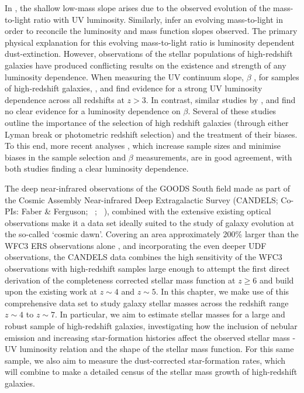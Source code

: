 In \citet{Gonzalez:2011dn}, the shallow low-mass slope arises due to the observed evolution of the mass-to-light ratio with UV luminosity. Similarly, \citet{2012ApJ...752...66L} infer an evolving mass-to-light in order to reconcile the luminosity and mass function slopes observed. The primary physical explanation for this evolving mass-to-light ratio is luminosity dependent dust-extinction. However, observations of the stellar populations of high-redshift galaxies have produced conflicting results on the existence and strength of any luminosity dependence. When measuring the UV continuum slope, $\beta$ \citep{1994ApJ...429..582C}, for samples of high-redshift galaxies, \citet{Wilkins:2011fs}, \citet{2012ApJ...754...83B} and \citet{Bouwens:2013vf} find evidence for a strong UV luminosity dependence across all redshifts at $z > 3$. In contrast, similar studies by \citet{Dunlop:2011jl}, \citet{2012ApJ...756..164F} and \citet{2013MNRAS.429.2456R} find no clear evidence for a luminosity dependence on $\beta$. Several of these studies outline the importance of the selection of high redshift galaxies (through either Lyman break or photometric redshift selection) and the treatment of their biases. To this end, more recent analyses \citep{Bouwens:2013vf,Rogers:2014bn}, which increase sample sizes and minimise biases in the sample selection and $\beta$ measurements, are in good agreement, with both studies finding a clear luminosity dependence.

The deep near-infrared observations of the GOODS South field made as part of the Cosmic Assembly Near-infrared Deep Extragalactic Survey (CANDELS; Co-PIs: Faber \& Ferguson; \citeauthor{2011ApJS..197...35G}~\citeyear{2011ApJS..197...35G}; \citeauthor{Koekemoer:2011br}~\citeyear{Koekemoer:2011br}), combined with the extensive existing optical observations make it a data set ideally suited to the study of galaxy evolution at the so-called `cosmic dawn'. Covering an area approximately 200\% larger than the WFC3 ERS observations alone \citep{2011ApJS..193...27W}, and incorporating the even deeper UDF observations, the CANDELS data combines the high sensitivity of the WFC3 observations with high-redshift samples large enough to attempt the first direct derivation of the completeness corrected stellar mass function at $z \geq 6$ and build upon the existing work at $z\sim 4$ and $z\sim5$. In this chapter, we make use of this comprehensive data set to study galaxy stellar masses across the redshift range $z \sim 4$ to $z \sim 7$. In particular, we aim to estimate stellar masses for a large and robust sample of high-redshift galaxies, investigating how the inclusion of nebular emission and increasing star-formation histories affect the observed stellar mass - UV luminosity relation and the shape of the stellar mass function. For this same sample, we also aim to measure the dust-corrected star-formation rates, which will combine to make a detailed census of the stellar mass growth of high-redshift galaxies. 

